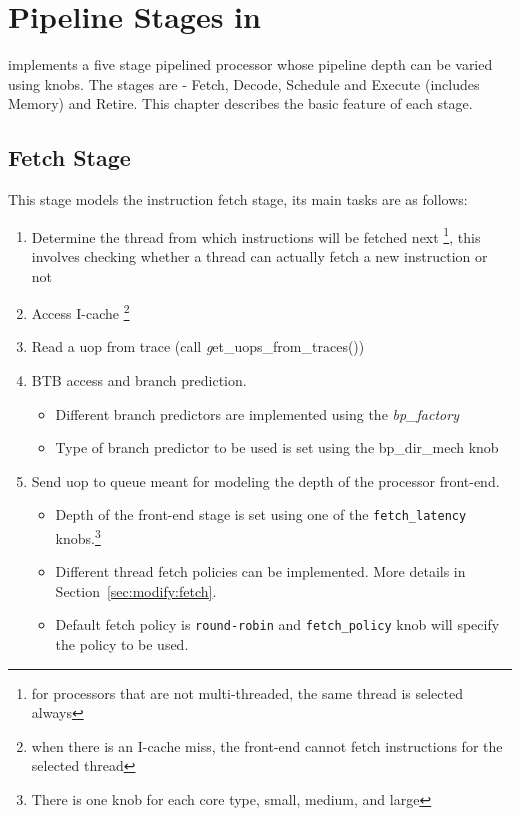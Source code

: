 \chapter{Pipeline Stages in \SIM}
\label{sec:pipeline}

\SIM implements a five stage pipelined processor whose pipeline depth can 
be varied using knobs. The stages are - Fetch, Decode, Schedule and Execute (includes
Memory) and Retire. This chapter describes the basic feature of each
stage.

\section{Fetch Stage}
This stage models the instruction fetch stage, its main tasks
are as follows:

\begin{enumerate}

\item Determine the thread from which instructions will be fetched next \footnote{for
    processors that are not multi-threaded, the same thread is selected
    always}, this involves checking whether a thread can actually fetch a new
	instruction or not

\item Access I-cache \footnote {when there is an I-cache miss, the front-end cannot fetch
    instructions for the selected thread}

\item Read a uop from trace (call {\textit get\_uops\_from\_traces()})

\item BTB access and branch prediction.
  \begin{itemize}
   \item Different branch predictors are implemented using the \textit{bp\_factory}
   \item Type of branch predictor to be used is set using the bp\_dir\_mech knob
  \end{itemize}

\item Send uop to queue meant for modeling the depth of the processor
  front-end.
  \begin{itemize}
   \item Depth of the front-end stage is set using one of the
	  \Verb+fetch_latency+ knobs.\footnote{There is one knob for each core
		type, small, medium, and large}
   \item Different thread fetch policies can be implemented. More details in
		Section~\ref{sec:modify:fetch}.
   \item Default fetch policy is \Verb+round-robin+ and \Verb+fetch_policy+ knob 
		will specify the policy to be used.
  \end{itemize}
  
\end{enumerate}


